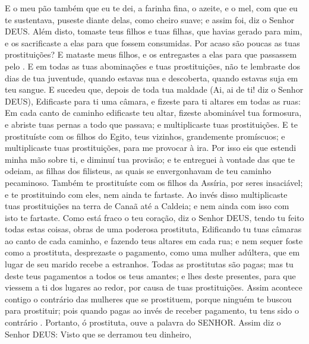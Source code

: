 {E o meu pão também que eu te dei, a farinha fina, o azeite, e o mel, com que eu te sustentava, puseste diante delas, como cheiro suave; e assim foi, diz o Senhor DEUS.
Além disto, tomaste teus filhos e tuas filhas, que havias gerado para mim, e os sacrificaste a elas para que fossem consumidas. Por acaso são poucas as tuas prostituições?
E mataste meus filhos, e os entregastes a elas para que passassem pelo
{} .
E em todas as tuas abominações e tuas prostituições, não te lembraste dos dias de tua juventude, quando estavas nua e descoberta, quando estavas suja em teu sangue.
E sucedeu que, depois de toda tua maldade (Ai, ai de ti! diz o Senhor DEUS),
Edificaste para ti uma câmara,
 e fizeste para ti altares em todas as ruas:
Em cada canto de caminho edificaste teu altar, fizeste abominável tua formosura, e abriste tuas pernas a todo que passava; e
{} multiplicaste tuas prostituições.
E te prostituíste com os filhos do Egito, teus vizinhos, grandemente promíscuos;
 e multiplicaste tuas prostituições, para me provocar à ira.
Por isso eis que estendi minha mão sobre ti, e diminuí tua provisão; e te entreguei à vontade das que te odeiam, as filhas dos filisteus, as quais se envergonhavam de teu caminho pecaminoso.
Também te prostituíste com os filhos da Assíria, por seres insaciável; e te prostituindo com eles, nem ainda te fartaste.
Ao invés disso multiplicaste tuas prostituições na terra de Canaã até a Caldeia; e nem ainda com isso com isto te fartaste.
Como está fraco o teu coração, diz o Senhor DEUS, tendo tu feito todas estas coisas, obras de uma poderosa prostituta,
Edificando tu tuas câmaras ao canto de cada caminho, e fazendo teus altares em cada rua; e nem sequer foste como a prostituta,
{} desprezaste o pagamento,
 como uma mulher adúltera, que em lugar de seu marido recebe a estranhos.
Todas as prostitutas são pagas; mas tu deste teus pagamentos a todos os teus amantes; e lhes deste presentes, para que viessem a ti dos lugares ao redor, por causa de tuas prostituições.
Assim acontece contigo o contrário das mulheres que se prostituem, porque ninguém te buscou para prostituir; pois quando pagas ao invés de receber pagamento, tu tens sido o contrário
{} .
Portanto, ó prostituta, ouve a palavra do SENHOR.
Assim diz o Senhor DEUS: Visto que se derramou teu dinheiro,
}
